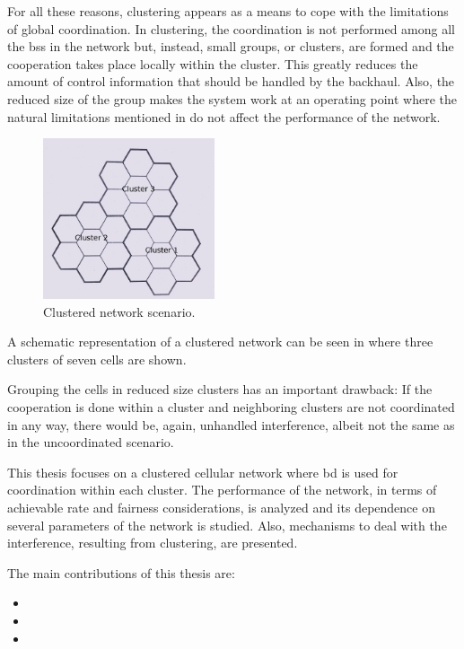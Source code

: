 For all these reasons, clustering appears as a means to cope with the
limitations of global coordination. In clustering, the coordination is not
performed among all the \glspl{bs} in the network but, instead, small groups, or
clusters, are formed and the cooperation takes place locally within the cluster.
This greatly reduces the amount of control information that should be handled by
the backhaul. Also, the reduced size of the group makes the system work at an
operating point where the natural limitations mentioned in \cite{lozano13} do
not affect the performance of the network.

\begin{figure}[t]
    \centering
    \includegraphics[width=0.45\textwidth]{./01.introduction/img/clustered_network.png}
    \caption{Clustered network scenario.}
    \label{fig:clustered_network}
\end{figure}

A schematic representation of a clustered network can be seen in
 where three clusters of seven cells are shown.

Grouping the cells in reduced size clusters has an important drawback: If the
cooperation is done within a cluster and neighboring clusters are not
coordinated in any way, there would be, again, unhandled interference, albeit
not the same as in the uncoordinated scenario.

This thesis focuses on a clustered cellular network where \gls{bd} is used for
coordination within each cluster. The performance of the network, in terms of
achievable rate and fairness considerations, is analyzed and its dependence on
several parameters of the network is studied. Also, mechanisms to deal with the
interference, resulting from clustering, are presented.

The main contributions of this thesis are:

\begin{itemize}
    \item {}
    \item {}
    \item {}
\end{itemize}

